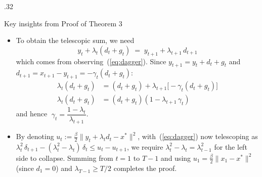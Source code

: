 \documentclass[final,t]{beamer}
\newcommand{\norm}[2][]{#1\lVert #2 #1\rVert}
\begin{document}
\begin{frame}[containsverbatim]
\begin{columns}[t]
\begin{column}{.32\linewidth}
\begin{exampleblock}{Key insights from Proof of Theorem $3$}
\begin{itemize}
      \begin{align*}
        \lambda_t\,\delta_{t+1} - (\lambda_t {-} 1)\,\delta_t
          &\leq -\frac{\beta}{2}\bigl(
            \lambda_t\norm{g_t}^2
            + 2\,g_t \cdot (y_t + \lambda_t d_t - x^*)\bigr)
      \end{align*}
      Multiplying both sides by $\lambda_t$ and applying the identity
      with $a = \lambda_t g_t$, \ $b = y_t + \lambda_t d_t - x^*$:
      \begin{align*}
        \lambda_t^2\,\delta_{t+1} - (\lambda_t^2 {-} \lambda_t)\,\delta_t
          &\leq -\frac{\beta}{2}\bigl(
            \norm{y_t + \lambda_t d_t + \lambda_t g_t - x^*}^2 \\[-2pt]
          &\phantom{{}\leq -\frac{\beta}{2}\bigl(}
            -\;\norm{y_t + \lambda_t d_t - x^*}^2\bigr)
          \tag{$\dagger$} \label{eq:dagger}
      \end{align*}
      \item To obtain the telescopic sum, we need
      \begin{equation*}
        y_t + \lambda_t(d_t + g_t)
          \;=\; y_{t+1} + \lambda_{t+1}\,d_{t+1}
      \end{equation*}
      which comes from observing~(\ref{eq:dagger}). Since $y_{t+1} = y_t + d_t + g_t$ and
      $d_{t+1} = x_{t+1} - y_{t+1} = -\gamma_t(d_t + g_t)$:
      \begin{align*}
        \lambda_t(d_t + g_t)
          &= (d_t + g_t) + \lambda_{t+1}\bigl[-\gamma_t(d_t + g_t)\bigr] \\
        \lambda_t(d_t + g_t)
          &= (d_t + g_t)(1 - \lambda_{t+1}\,\gamma_t)
      \end{align*}
      and hence
      $\;\gamma_t = \dfrac{1 - \lambda_t}{\lambda_{t+1}}$.
      \item  By denoting
      $u_t := \tfrac{\beta}{2}\norm{y_t + \lambda_t d_t - x^*}^2$, with~(\ref{eq:dagger}) now telescoping as
      $\lambda_t^2\,\delta_{t+1} - (\lambda_t^2 {-} \lambda_t)\,\delta_t
      \leq u_t - u_{t+1}$, we require
      $\lambda_t^2 - \lambda_t = \lambda_{t-1}^2$ for the left side
      to collapse. Summing from $t=1$ to $T{-}1$ and using
      $u_1 = \tfrac{\beta}{2}\norm{x_1 - x^*}^2$
      (since $d_1 = 0$) and $\lambda_{T-1} \geq T/2$
      completes the proof.
    \end{itemize}
    \end{exampleblock}



\end{column}
\end{columns}
\end{frame}
\end{document}
